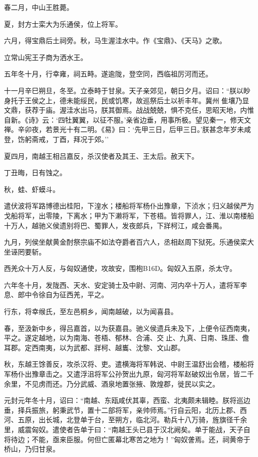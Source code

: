 \documentclass[]{article}
\begin{document}
春二月，中山王胜薨。

夏，封方士栾大为乐通侯，位上将军。

六月，得宝鼎后土祠旁。秋，马生渥洼水中。作《宝鼎》、《天马》之歌。

立常山宪王子商为洒水王。

五年冬十月，行幸雍，祠五畤。遂逾陇，登空同，西临祖厉河而还。

十一月辛巳朔旦，冬至。立泰畤于甘泉。天子亲郊见，朝日夕月。诏曰：``朕以眇身托于王侯之上，德未能绥民，民或饥寒，故巡祭后土以祈丰年。冀州隹壤乃显文鼎，获荐于庙。渥洼水出马，朕其御焉。战战兢兢，惧不克任，思昭天地，内惟自新。《诗》云：`四牡翼翼，以征不服。'亲省边垂，用事所极。望见秦一，修天文禅。辛卯夜，若景光十有二明。《易》曰：`先甲三日，后甲三日。'朕甚念年岁未咸登，饬躬斋戒，丁酉，拜况于郊。''

夏四月，南越王相吕嘉反，杀汉使者及其王、王太后。赦天下。

丁丑晦，日有蚀之。

秋，蛙、虾蟆斗。

遣伏波将军路博德出桂阳，下湟水；楼船将军杨仆出豫章，下浈水；归义越侯严为戈船将军，出零陵，下离水；甲为下濑将军，下苍梧。皆将罪人，江、淮以南楼船十万人，越驰义侯遗别将巴、蜀罪人，发夜郎兵，下牂柯江，咸会番禺。

九月，列侯坐献黄金酎祭宗庙不如法夺爵者百六人，丞相赵周下狱死。乐通侯栾大坐诬罔要斩。

西羌众十万人反，与匈奴通使，攻故安，围枹B16D。匈奴入五原，杀太守。

六年冬十月，发陇西、天水、安定骑士及中尉、河南、河内卒十万人，遣将军李息、郎中令徐自为征西羌，平之。

行东，将幸缑氏，至左邑桐乡，闻南越破，以为闻喜县。

春，至汲新中乡，得吕嘉首，以为获嘉县。驰义侯遗兵未及下，上便令征西南夷，平之。遂定越地，以为南海、苍梧、郁林、合浦、交止、九真、日南、珠厓、儋耳郡。定西南夷，以为武都、牂柯、越巂、沈黎、文山郡。

秋，东越王馀善反，攻杀汉将、吏。遣横海将军韩说、中尉王温舒出会稽，楼船将军杨仆出豫章击之。又遣浮沮将军公孙贺出九原，匈河将军赵破奴出令居，皆二千余里，不见虏而还。乃分武威、酒泉地置张掖、敦煌郡，徙民以实之。

元封元年冬十月，诏曰：``南越、东瓯咸伏其辜，西蛮、北夷颇未辑睦。朕将巡边垂，择兵振旅，躬秉武节，置十二部将军，亲帅师焉。''行自云阳，北历上郡、西河、五原，出长城，北登单于台，至朔方，临北河。勒兵十八万骑，旌旗径千余里，威震匈奴。遣使者告单于曰：``南越王头已县于汉北阙矣。单于能战，天子自将待边；不能，亟来臣服。何但亡匿幕北寒苦之地为！''匈奴詟焉。还，祠黄帝于桥山，乃归甘泉。
\end{document}
